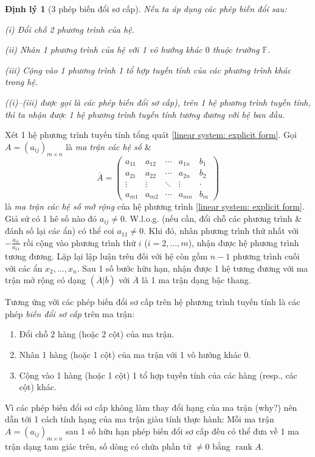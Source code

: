 \documentclass{article}
\newtheorem{dinhly}{Định lý}
\begin{document}
\begin{dinhly}[3 phép biến đổi sơ cấp]
	Nếu ta áp dụng các phép biến đổi sau:
	\item(i) Đổi chỗ 2 phương trình của hệ.
	\item(ii) Nhân 1 phương trình của hệ với 1 vô hướng khác $0$ thuộc trường $\mathbb{F}$.
	\item(iii) Cộng vào 1 phương trình 1 tổ hợp tuyến tính của các phương trình khác trong hệ.
	
	((i)--(iii) được gọi là các {\rm phép biến đổi sơ cấp}), trên 1 hệ phương trình tuyến tính, thì ta nhận được 1 hệ phương trình tuyến tính tương đương với hệ ban đầu.
\end{dinhly}
Xét 1 hệ phương trình tuyến tính tổng quát \eqref{linear system: explicit form}. Gọi $A = (a_{ij})_{m\times n}$ là {\it ma trận các hệ số} \&
\begin{equation*}
	\overline{A} = \begin{pmatrix}
		a_{11} & a_{12} & \cdots & a_{1n} & b_1\\
		a_{21} & a_{22} & \cdots & a_{2n} & b_2\\
		\vdots & \vdots & \ddots & \vdots & \cdot\\
		a_{m1} & a_{m2} & \cdots & a_{mn} & b_m
	\end{pmatrix}
\end{equation*}
là {\it ma trận các hệ số mở rộng} của hệ phương trình \eqref{linear system: explicit form}. Giả sử có 1 hê số nào đó $a_{ij}\ne0$. W.l.o.g. (nếu cần, đổi chỗ các phương trình \& đánh số lại các ẩn) có thể coi $a_{11}\ne0$. Khi đó, nhân phương trình thứ nhất với $-\frac{a_{i1}}{a_{11}}$ rồi cộng vào phương trình thứ $i$ ($i = 2,\ldots,m$), nhận được hệ phương trình tương đương. Lặp lại lập luận trên đối với hệ còn gồm $n - 1$ phương trình cuối với các ẩn $x_2,\ldots,x_n$. Sau 1 số bước hữu hạn, nhận được 1 hệ tương đương với ma trận mở rộng có dạng $(\overline{A}|\overline{b})$ với $\overline{A}$ là 1 ma trận dạng bậc thang.

Tương ứng với các phép biến đổi sơ cấp trên hệ phương trình tuyến tính là các phép {\it biến đổi sơ cấp} trên ma trận:
\begin{enumerate}
	\item Đổi chỗ 2 hàng (hoặc 2 cột) của ma trận.
	\item Nhân 1 hàng (hoặc 1 cột) của ma trận với 1 vô hướng khác $0$.
	\item Cộng vào 1 hàng (hoặc 1 cột) 1 tổ hợp tuyến tính của các hàng (resp., các cột) khác.
\end{enumerate}
Vì các phép biến đổi sơ cấp không làm thay đổi hạng của ma trận (why?) nên dẫn tới 1 cách tính hạng của ma trận giàu tính thực hành: Mỗi ma trận $A = (a_{ij})_{m\times n}$ sau 1 số hữu hạn phép biến đổi sơ cấp đều có thể đưa về 1 ma trận dạng tam giác trên, số dòng có chứa phần tử $\ne0$ bằng $\operatorname{rank}A$.
\end{document}
